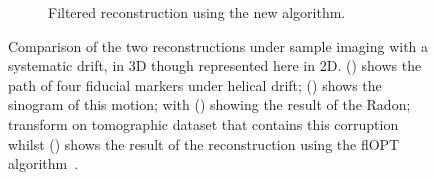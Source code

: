 \documentclass{osa-article}
\begin{document}
\begin{figure}
\begin{subfigure}[t]{0.3\linewidth}
    \caption{Filtered reconstruction using the new algorithm.}\label{fig:filtered_recon_helix}\label{fig:flopt_filter}
  \end{subfigure}
  \hspace*{\fill}
  \caption{Comparison of the two reconstructions under sample imaging with a systematic drift, in 3D though represented here in 2D. () shows the path of four fiducial markers under helical drift; () shows the sinogram of this motion; with () showing the result of the Radon; transform on tomographic dataset that contains this corruption whilst () shows the result of the reconstruction using the flOPT algorithm~\cite{craig_russell_2020_4073437}.}\label{fig:flopts}
\end{figure}
\end{document}
